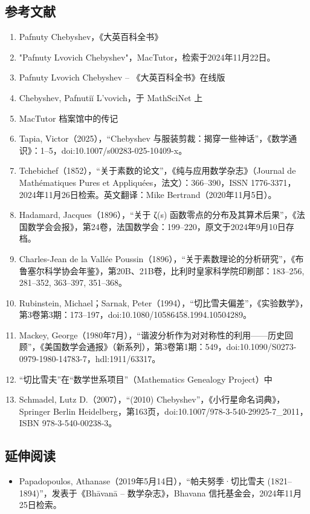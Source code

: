 \subsection{参考文献}
\begin{enumerate}
\item Pafnuty Chebyshev，《大英百科全书》
\item "Pafnuty Lvovich Chebyshev"，MacTutor，检索于2024年11月22日。
\item Pafnuty Lvovich Chebyshev – 《大英百科全书》在线版
\item Chebyshev, Pafnutiĭ L'vovich，于 MathSciNet 上
\item MacTutor 档案馆中的传记
\item Tapia, Victor（2025），“Chebyshev 与服装剪裁：揭穿一些神话”，《数学通识》：1–5，doi:10.1007/s00283-025-10409-x。
\item Tchebichef（1852），“关于素数的论文”，《纯与应用数学杂志》（Journal de Mathématiques Pures et Appliquées，法文）：366–390，ISSN 1776-3371，2024年11月26日检索。英文翻译：Mike Bertrand（2020年11月5日）。
\item Hadamard, Jacques（1896），“关于 ζ(s) 函数零点的分布及其算术后果”，《法国数学会会报》，第24卷，法国数学会：199–220，原文于2024年9月10日存档。
\item Charles-Jean de la Vallée Poussin（1896），“关于素数理论的分析研究”，《布鲁塞尔科学协会年鉴》，第20B、21B卷，比利时皇家科学院印刷部：183–256, 281–352, 363–397, 351–368。
\item Rubinstein, Michael；Sarnak, Peter（1994），“切比雪夫偏差”，《实验数学》，第3卷第3期：173–197，doi:10.1080/10586458.1994.10504289。
\item Mackey, George（1980年7月），“谐波分析作为对对称性的利用——历史回顾”，《美国数学会通报》（新系列），第3卷第1期：549，doi:10.1090/S0273-0979-1980-14783-7，hdl:1911/63317。
\item “切比雪夫”在“数学世系项目”（Mathematics Genealogy Project）中
\item Schmadel, Lutz D.（2007），“(2010) Chebyshev”，《小行星命名词典》，Springer Berlin Heidelberg，第163页，doi:10.1007/978-3-540-29925-7\_2011，ISBN 978-3-540-00238-3。
\end{enumerate}
\subsection{延伸阅读}
\begin{itemize}
\item Papadopoulos, Athanase（2019年5月14日），“帕夫努季·切比雪夫 (1821–1894)”，发表于《Bhāvanā – 数学杂志》，Bhavana 信托基金会，2024年11月25日检索。
\end{itemize}
